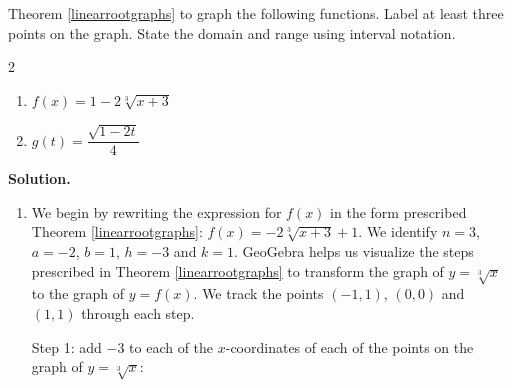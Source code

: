\documentclass{ximera}
\begin{document}
\begin{example} \label{rootshifts}  Theorem \ref{linearrootgraphs} to graph the following functions.  Label at least three points on the graph.  State the domain and range using interval notation.

\begin{multicols}{2}

\begin{enumerate}

\item $f(x) =  1 -2 \sqrt[3]{x+3}$ 


\item  $g(t) = \dfrac{\sqrt{1-2t}}{4}$


\end{enumerate}

\end{multicols}

{\bf Solution.}

\begin{enumerate}

\item  We begin by rewriting the expression for $f(x)$ in the form prescribed Theorem \ref{linearrootgraphs}:  $f(x) = -2 \sqrt[3]{x+3} + 1$.  We identify $n=3$, $a = -2$, $b = 1$, $h = -3$ and $k = 1$.  GeoGebra helps us visualize the steps prescribed in Theorem \ref{linearrootgraphs}  to transform the graph of $y = \sqrt[3]{x}$ to the graph of $y=f(x)$.  We track the points $(-1,1)$, $(0,0)$ and $(1,1)$ through each step.

Step 1:   add $-3$ to each of the $x$-coordinates of each of the points on the graph of $y=\sqrt[3]{x}$:






\end{enumerate}
\end{example}
\end{document}
